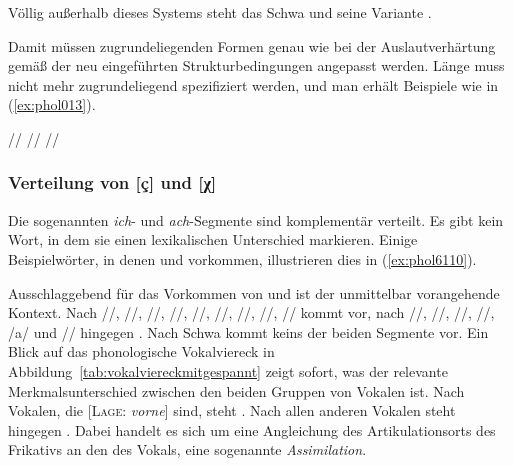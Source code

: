
Völlig außerhalb dieses Systems steht das Schwa und seine Variante \textipa{[5]}.


Damit müssen zugrundeliegenden Formen genau wie bei der Auslautverhärtung gemäß der neu eingeführten Strukturbedingungen angepasst werden.
Länge muss nicht mehr zugrundeliegend spezifiziert werden, und man erhält Beispiele wie in (\ref{ex:phol013}).

\begin{exe}
  \ex\label{ex:phol013} \begin{xlist}
  	\ex // \phopro \textipa{[ve:g]}
  	\ex // \phopro \textipa{[h\o:l@]} 
  	\ex // \phopro \textipa{[o:f@n]}
  \end{xlist}
\end{exe}


\subsubsection{Verteilung von [ç] und [χ]}

\label{sec:prozichach}

Die sogenannten \textit{ich}- und \textit{ach}-Segmente sind komplementär verteilt.
Es gibt kein Wort, in dem sie einen lexikalischen Unterschied markieren.
Einige Beispielwörter, in denen \textipa{[\c{c}]} und \textipa{[X]} vorkommen, illustrieren dies in (\ref{ex:phol6110}).

\begin{exe}
  \ex\label{ex:phol6110}
  \begin{xlist}
  \end{xlist}
\end{exe}

Ausschlaggebend für das Vorkommen von \textipa{[\c{c}]} und \textipa{[X]} ist der unmittelbar vorangehende Kontext.
Nach //, //, //, //, //, /\textipa{\o}/, //, //, /\textipa{\oe}/ kommt \textipa{[\c{c}]} vor, nach //, //, //, //, /a/ und // hingegen \textipa{[X]}.
Nach Schwa kommt keins der beiden Segmente vor.
Ein Blick auf das phonologische Vokalviereck in Abbildung~\ref{tab:vokalviereckmitgespannt} zeigt sofort, was der relevante Merkmalsunterschied zwischen den beiden Gruppen von Vokalen ist.
Nach Vokalen, die [\textsc{Lage}: \textit{vorne}] sind, steht \textipa{[\c{c}]}.
Nach allen anderen Vokalen steht hingegen \textipa{[X]}.
Dabei handelt es sich um eine Angleichung des Artikulationsorts des Frikativs an den des Vokals, eine sogenannte \textit{Assimilation}.

